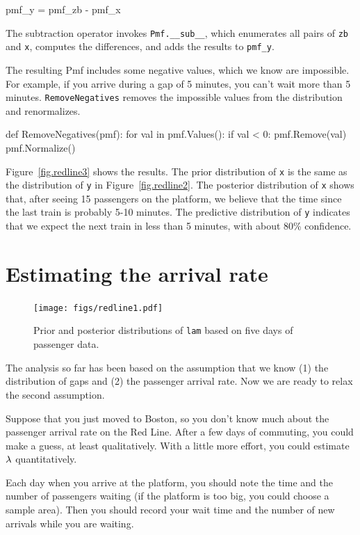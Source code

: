 \documentclass[12pt]{book}
\theoremstyle{exercise}
\newcommand{\py}[1]{{\tt #1}}%
\begin{document}
\begin{code}
    pmf_y = pmf_zb - pmf_x
\end{code}

The subtraction operator invokes \verb"Pmf.__sub__", which enumerates
all pairs of \py{zb} and \py{x}, computes the differences, and adds
the results to \verb"pmf_y".

The resulting Pmf includes some negative values, which we know are
impossible.  For example, if you arrive during a gap of 5 minutes, you
can't wait more than 5 minutes.  \py{RemoveNegatives} removes the
impossible values from the distribution and renormalizes.

\begin{code}
def RemoveNegatives(pmf):
    for val in pmf.Values():
        if val < 0:
            pmf.Remove(val)
    pmf.Normalize()
\end{code}

Figure~\ref{fig.redline3} shows the results.  The prior distribution
of \py{x} is the same as the distribution of \py{y} in
Figure~\ref{fig.redline2}.  The posterior distribution of \py{x}
shows that, after seeing 15 passengers on the platform, we believe
that the time since the last train is probably 5-10 minutes.  The
predictive distribution of \py{y} indicates that we expect the next
train in less than 5 minutes, with about 80\% confidence.


\section{Estimating the arrival rate}

\begin{figure}
\centerline{\texttt{[image: figs/redline1.pdf]}}
\caption{Prior and posterior distributions of \py{lam} based
on five days of passenger data. }
\label{fig.redline1}
\end{figure}

The analysis so far has been based on the assumption that we know (1)
the distribution of gaps and (2) the passenger arrival rate.  Now we
are ready to relax the second assumption.

Suppose that you just moved to Boston, so you don't know much about
the passenger arrival rate on the Red Line.  After a few days of
commuting, you could make a guess, at least qualitatively.  With
a little more effort, you could estimate $\mathtt{\lambda}$ quantitatively.

Each day when you arrive at the platform, you should note the
time and the number of passengers waiting (if the platform is too
big, you could choose a sample area).  Then you should record your
wait time and the
number of new arrivals while you are waiting.
\end{document}
